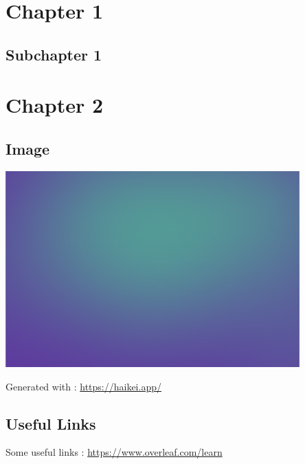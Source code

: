 {\selectfont
\begin{adjustwidth}{20pt}{20pt}
    \tableofcontents
	\newpage
    \section{Chapter 1} %
    \subsection{Subchapter 1}
    \lipsum[1]
    \section{Chapter 2}
    \lipsum[1-3]
    \subsection{Image}
    \includegraphics[width=0.85\textwidth]{svg.png}
    
    Generated with :
    \url{https://haikei.app/}
    \subsection{Useful Links}
    Some useful links :
    \url{https://www.overleaf.com/learn}
\end{adjustwidth}}

